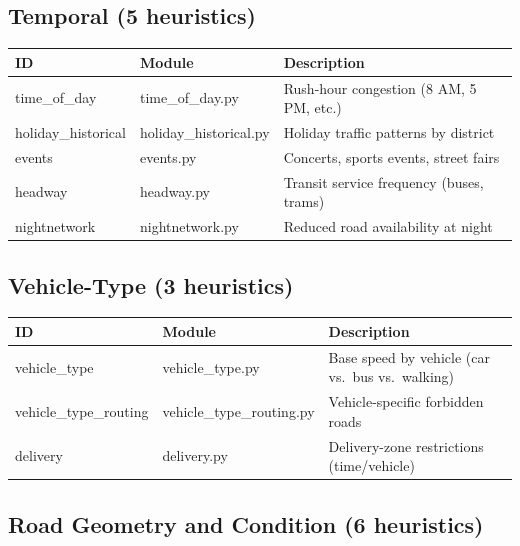 \documentclass[12pt,a4paper]{article}
\begin{document}
\subsection{Temporal (5 heuristics)}

\begin{table}[H]
\centering
\small
\begin{tabular}{lll}
\toprule
\textbf{ID} & \textbf{Module} & \textbf{Description} \\
\midrule
time\_of\_day & time\_of\_day.py & Rush-hour congestion (8 AM, 5 PM, etc.) \\
holiday\_historical & holiday\_historical.py & Holiday traffic patterns by district \\
events & events.py & Concerts, sports events, street fairs \\
headway & headway.py & Transit service frequency (buses, trams) \\
nightnetwork & nightnetwork.py & Reduced road availability at night \\
\bottomrule
\end{tabular}
\end{table}

\subsection{Vehicle-Type (3 heuristics)}

\begin{table}[H]
\centering
\small
\begin{tabular}{lll}
\toprule
\textbf{ID} & \textbf{Module} & \textbf{Description} \\
\midrule
vehicle\_type & vehicle\_type.py & Base speed by vehicle (car vs.\ bus vs.\ walking) \\
vehicle\_type\_routing & vehicle\_type\_routing.py & Vehicle-specific forbidden roads \\
delivery & delivery.py & Delivery-zone restrictions (time/vehicle) \\
\bottomrule
\end{tabular}
\end{table}

\subsection{Road Geometry and Condition (6 heuristics)}
\end{document}
